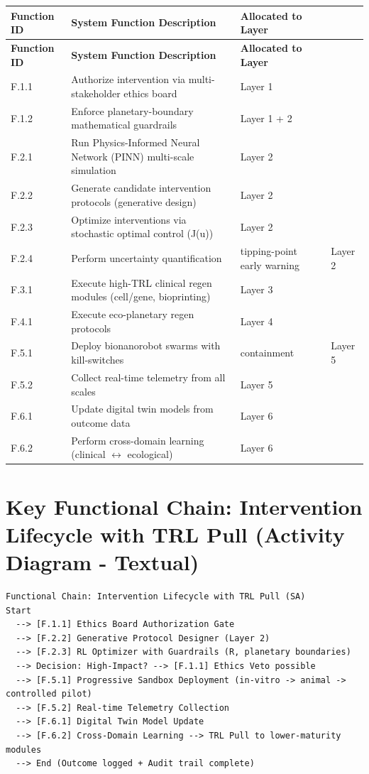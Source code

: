 \documentclass[11pt,a4paper]{report}
\begin{document}
\begin{longtable}{>{\raggedright\arraybackslash}p{2.2cm} p{8cm} p{3.5cm}}
\toprule
\textbf{Function ID} & \textbf{System Function Description} & \textbf{Allocated to Layer} \\
\midrule
\endfirsthead
\toprule
\textbf{Function ID} & \textbf{System Function Description} & \textbf{Allocated to Layer} \\
\midrule
\endhead
\bottomrule
\endfoot
F.1.1 & Authorize intervention via multi-stakeholder ethics board & Layer 1 \\
F.1.2 & Enforce planetary-boundary mathematical guardrails & Layer 1 + 2 \\
F.2.1 & Run Physics-Informed Neural Network (PINN) multi-scale simulation & Layer 2 \\
F.2.2 & Generate candidate intervention protocols (generative design) & Layer 2 \\
F.2.3 & Optimize interventions via stochastic optimal control (J(u)) & Layer 2 \\
F.2.4 & Perform uncertainty quantification & tipping-point early warning & Layer 2 \\
F.3.1 & Execute high-TRL clinical regen modules (cell/gene, bioprinting) & Layer 3 \\
F.4.1 & Execute eco-planetary regen protocols & Layer 4 \\
F.5.1 & Deploy bionanorobot swarms with kill-switches & containment & Layer 5 \\
F.5.2 & Collect real-time telemetry from all scales & Layer 5 \\
F.6.1 & Update digital twin models from outcome data & Layer 6 \\
F.6.2 & Perform cross-domain learning (clinical $\leftrightarrow$ ecological) & Layer 6 \\
\bottomrule
\end{longtable}

\section{Key Functional Chain: Intervention Lifecycle with TRL Pull (Activity Diagram - Textual)}

\begin{lstlisting}[style=sysmlstyle, caption={Functional Chain: End-to-End Intervention Lifecycle + TRL Pull}]
Functional Chain: Intervention Lifecycle with TRL Pull (SA)
Start
  --> [F.1.1] Ethics Board Authorization Gate
  --> [F.2.2] Generative Protocol Designer (Layer 2)
  --> [F.2.3] RL Optimizer with Guardrails (R, planetary boundaries)
  --> Decision: High-Impact? --> [F.1.1] Ethics Veto possible
  --> [F.5.1] Progressive Sandbox Deployment (in-vitro -> animal -> controlled pilot)
  --> [F.5.2] Real-time Telemetry Collection
  --> [F.6.1] Digital Twin Model Update
  --> [F.6.2] Cross-Domain Learning --> TRL Pull to lower-maturity modules
  --> End (Outcome logged + Audit trail complete)
\end{lstlisting}
\end{document}
